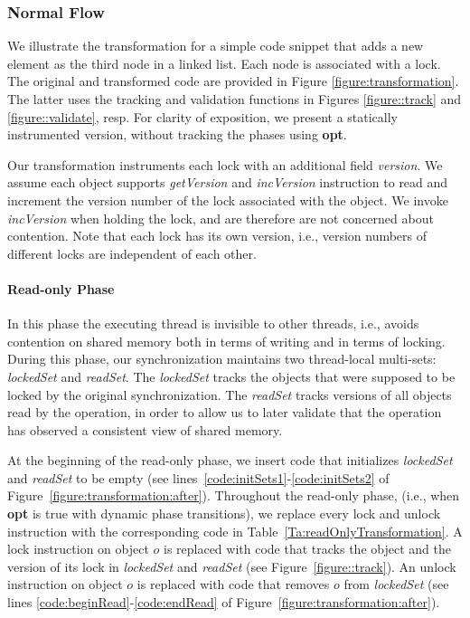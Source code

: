 \subsubsection{Normal Flow}
\label{sssec:alg-normal}

We illustrate the transformation for a simple code snippet that adds a new element as the third node in a linked list. Each node is associated with a  lock.
The original and transformed code are provided in Figure \ref{figure:transformation}. The latter uses
the tracking and validation functions in Figures \ref{figure::track} and
\ref{figure::validate}, resp.
For clarity of exposition, we present a statically instrumented version, without tracking the phases using \textbf{opt}.


Our transformation instruments each lock with an additional field \emph{version}. We assume each object supports \emph{getVersion} and \emph{incVersion} instruction to read and increment the version number of the lock associated with the object. We invoke \emph{incVersion} when holding the lock, and are therefore are not concerned about contention.
Note that each lock has its own version, i.e., version numbers of different locks are independent of each other.

\paragraph{Read-only Phase}
In this phase the executing thread is invisible to other threads, i.e., 
 avoids  contention on shared memory both in terms of writing and in terms of locking.
During this phase, our synchronization maintains two thread-local multi-sets: \emph{lockedSet} and \emph{readSet}.
The \emph{lockedSet} tracks the objects that were supposed to be locked by the original synchronization.
%
The \emph{readSet} tracks versions of all objects read by the
operation, in order to allow us to later validate that the operation has observed a consistent view of shared memory.

At the beginning of the read-only phase, we insert code that initializes \emph{lockedSet} and \emph{readSet} to be empty (see  lines~\ref{code:initSets1}-\ref{code:initSets2} of Figure~\ref{figure:transformation:after}).
Throughout the read-only phase, (i.e., when \textbf{opt} is true with dynamic phase transitions), 
we replace every lock and unlock instruction with the corresponding code in Table~\ref{Ta:readOnlyTransformation}.
A lock instruction on object $o$ is replaced with code that tracks the object and the version of its lock in
 \emph{lockedSet} and \emph{readSet} (see Figure~\ref{figure::track}).
An unlock instruction on object $o$ is replaced with code that removes $o$ from \emph{lockedSet} (see
lines \ref{code:beginRead}-\ref{code:endRead} of Figure~\ref{figure:transformation:after}).

